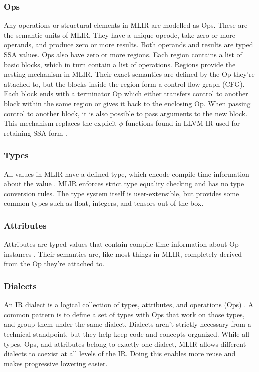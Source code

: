 \subsubsection{Ops}
Any operations or structural elements in MLIR are modelled as Ops. These are the semantic units of MLIR. They have a unique opcode, take zero or more operands, and produce zero or more results. Both operands and results are typed SSA values. Ops also have zero or more regions. Each region contains a list of basic blocks, which in turn contain a list of operations. Regions provide the nesting mechanism in MLIR. Their exact semantics are defined by the Op they're attached to, but the blocks inside the region form a control flow graph (CFG). Each block ends with a terminator Op which either transfers control to another block within the same region or gives it back to the enclosing Op. When passing control to another block, it is also possible to pass arguments to the new block. This mechanism replaces the explicit $\phi$-functions found in LLVM IR used for retaining SSA form \cite{llvm_lang_ref, mlir}. 

\subsubsection{Types}
All values in MLIR have a defined type, which encode compile-time information about the value \cite{mlir}. MLIR enforces strict type equality checking and has no type conversion rules. The type system itself is user-extensible, but provides some common types such as float, integers, and tensors out of the box. 

\subsubsection{Attributes}
Attributes are typed values that contain compile time information about Op instances \cite{mlir}. Their semantics are, like most things in MLIR, completely derived from the Op they're attached to.

\subsubsection{Dialects}
An IR dialect is a logical collection of types, attributes, and operations (Ops) \cite{mlir}. A common pattern is to define a set of types with Ops that work on those types, and group them under the same dialect. Dialects aren't strictly necessary from a technical standpoint, but they help keep code and concepts organized. While all types, Ops, and attributes belong to exactly one dialect, MLIR allows different dialects to coexist at all levels of the IR. Doing this enables more reuse and makes progressive lowering easier.

